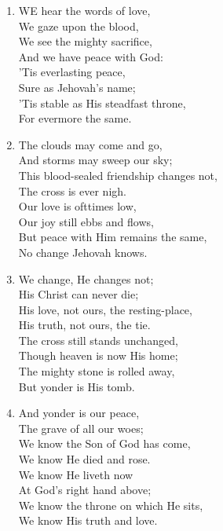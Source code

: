 \documentclass[11pt,a4paper]{article}
\begin{document}
\begin{enumerate}
    \item WE hear the words of love, \\
        We gaze upon the blood, \\
        We see the mighty sacrifice, \\
        And we have peace with God: \\
        'Tis everlasting peace, \\
        Sure as Jehovah's name; \\
        'Tis stable as His steadfast throne, \\
        For evermore the same.

    \item The clouds may come and go, \\
        And storms may sweep our sky; \\
        This blood-sealed friendship changes not, \\
        The cross is ever nigh. \\
        Our love is ofttimes low, \\
        Our joy still ebbs and flows, \\
        But peace with Him remains the same, \\
        No change Jehovah knows.

    \item We change, He changes not; \\
        His Christ can never die; \\
        His love, not ours, the resting-place, \\
        His truth, not ours, the tie. \\
        The cross still stands unchanged, \\
        Though heaven is now His home; \\
        The mighty stone is rolled away, \\
        But yonder is His tomb.

    \item And yonder is our peace, \\
        The grave of all our woes; \\
        We know the Son of God has come, \\
        We know He died and rose. \\
        We know He liveth now \\
        At God's right hand above; \\
        We know the throne on which He sits, \\
        We know His truth and love.

\end{enumerate}
\end{document}
